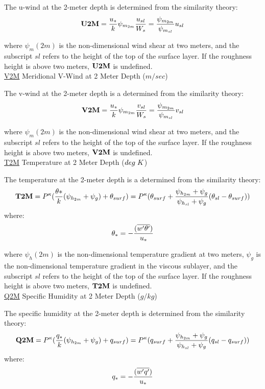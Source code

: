 \noindent
The u-wind at the 2-meter depth is determined from the similarity theory:
\[
{\bf U2M} = {u_* \over k} \psi_{m_{2m}} {u_{sl} \over {W_s}} =
{ \psi_{m_{2m}} \over {\psi_{m_{sl}} }}u_{sl}
\]

\noindent
where $\psi_m(2m)$ is the non-dimensional wind shear at two meters, and the subscript
$sl$ refers to the height of the top of the surface layer. If the roughness height
is above two meters, ${\bf U2M}$ is undefined.
\\
 
\noindent
{ \underline {V2M}  Meridional V-Wind at 2 Meter Depth ($m/sec$) }

\noindent
The v-wind at the 2-meter depth is a determined from the similarity theory:
\[
{\bf V2M} = {u_* \over k} \psi_{m_{2m}} {v_{sl} \over {W_s}} =
{ \psi_{m_{2m}} \over {\psi_{m_{sl}} }}v_{sl}
\]

\noindent
where $\psi_m(2m)$ is the non-dimensional wind shear at two meters, and the subscript
$sl$ refers to the height of the top of the surface layer. If the roughness height
is above two meters, ${\bf V2M}$ is undefined.
\\
 
\noindent
{ \underline {T2M}  Temperature at 2 Meter Depth ($deg \hspace{.1cm} K$) }

\noindent
The temperature at the 2-meter depth is a determined from the similarity theory:
\[
{\bf T2M} = P^{\kappa} ({\theta* \over k} ({\psi_{h_{2m}}+\psi_g}) + \theta_{surf} ) = 
P^{\kappa}(\theta_{surf} + { {\psi_{h_{2m}}+\psi_g} \over {{\psi_{h_{sl}}+\psi_g}} }
(\theta_{sl} - \theta_{surf})) 
\]
where:
\[
\theta_* = - { (\overline{w^{\prime}\theta^{\prime}}) \over {u_*} }
\]

\noindent
where $\psi_h(2m)$ is the non-dimensional temperature gradient at two meters, $\psi_g$ is
the non-dimensional temperature gradient in the viscous sublayer, and the subscript
$sl$ refers to the height of the top of the surface layer. If the roughness height
is above two meters, ${\bf T2M}$ is undefined.
\\
 
\noindent
{ \underline {Q2M}  Specific Humidity at 2 Meter Depth ($g/kg$) }

\noindent
The specific humidity at the 2-meter depth is determined from the similarity theory:
\[
{\bf Q2M} = P^{\kappa} ({q_* \over k} ({\psi_{h_{2m}}+\psi_g}) + q_{surf} ) = 
P^{\kappa}(q_{surf} + { {\psi_{h_{2m}}+\psi_g} \over {{\psi_{h_{sl}}+\psi_g}} }
(q_{sl} - q_{surf})) 
\]
where:
\[
q_* = - { (\overline{w^{\prime}q^{\prime}}) \over {u_*} }
\]

